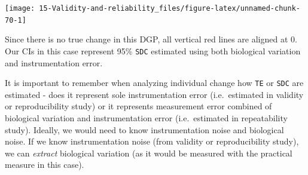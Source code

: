 \documentclass[
]{book}
\newenvironment{Shaded}{\begin{snugshade}}{\end{snugshade}}
\newcommand{\CommentTok}[1]{\textcolor[rgb]{0.56,0.35,0.01}{\textit{#1}}}
\newcommand{\DataTypeTok}[1]{\textcolor[rgb]{0.13,0.29,0.53}{#1}}
\newcommand{\DecValTok}[1]{\textcolor[rgb]{0.00,0.00,0.81}{#1}}
\newcommand{\FloatTok}[1]{\textcolor[rgb]{0.00,0.00,0.81}{#1}}
\newcommand{\KeywordTok}[1]{\textcolor[rgb]{0.13,0.29,0.53}{\textbf{#1}}}
\newcommand{\NormalTok}[1]{#1}
\newcommand{\OperatorTok}[1]{\textcolor[rgb]{0.81,0.36,0.00}{\textbf{#1}}}
\newcommand{\OtherTok}[1]{\textcolor[rgb]{0.56,0.35,0.01}{#1}}
\newcommand{\StringTok}[1]{\textcolor[rgb]{0.31,0.60,0.02}{#1}}
\begin{document}
\begin{Shaded}
\end{Shaded}

\begin{center}\texttt{[image: 15-Validity-and-reliability\_files/figure-latex/unnamed-chunk-70-1]} \end{center}

Since there is no true change in this DGP, all vertical red lines are aligned at 0. Our CIs in this case represent 95\% \texttt{SDC} estimated using both biological variation and instrumentation error.

It is important to remember when analyzing individual change how \texttt{TE} or \texttt{SDC} are estimated - does it represent sole instrumentation error (i.e.~estimated in validity or reproducibility study) or it represents measurement error combined of biological variation and instrumentation error (i.e.~estimated in repeatability study). Ideally, we would need to know instrumentation noise and biological noise. If we know instrumentation noise (from validity or reproducibility study), we can \emph{extract} biological variation (as it would be measured with the practical measure in this case).
\end{document}
